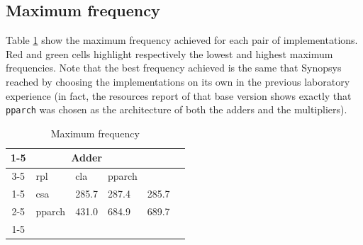 \documentclass[a4paper]{article}
\begin{document}
\subsection{Maximum frequency}
Table \ref{tab:fmax} show the maximum frequency achieved for each pair of implementations. Red and green cells highlight respectively the lowest and highest maximum frequencies. Note that the best frequency achieved is the same that Synopsys reached by choosing the implementations on its own in the previous laboratory experience (in fact, the resources report of that base version shows exactly that \texttt{pparch} was chosen as the architecture of both the adders and the multipliers).
\begin{table}[hbtp]
	\centering
	\begin{tabular}{clllll}
	\cline{1-5}
	\multicolumn{2}{|c|}{}                                                           & \multicolumn{3}{c|}{Adder}                                                                                                           &  \\ \cline{3-5}
	\multicolumn{2}{|c|}{\multirow{-2}{*}{$f_{max}$ [\si{\mega\hertz}]}}               & \multicolumn{1}{l|}{rpl}                           & \multicolumn{1}{l|}{cla}   & \multicolumn{1}{l|}{pparch}                        &  \\ \cline{1-5}
	\multicolumn{1}{|c|}{}                             & \multicolumn{1}{l|}{csa}    & \multicolumn{1}{l|}{\cellcolor[HTML]{FFCCC9}285.7} & \multicolumn{1}{l|}{287.4} & \multicolumn{1}{l|}{285.7} &  \\ \cline{2-5}
	\multicolumn{1}{|c|}{\multirow{-2}{*}{Multiplier}} & \multicolumn{1}{l|}{pparch} & \multicolumn{1}{l|}{431.0}                         & \multicolumn{1}{l|}{684.9} & \multicolumn{1}{l|}{\cellcolor[HTML]{9AFF99}689.7} &  \\ \cline{1-5}
	\multicolumn{1}{l}{}                               &                             &                                                    &                            &                                                    &
	\end{tabular}
	\caption{Maximum frequency}
	\label{tab:fmax}
\end{table}
\end{document}
